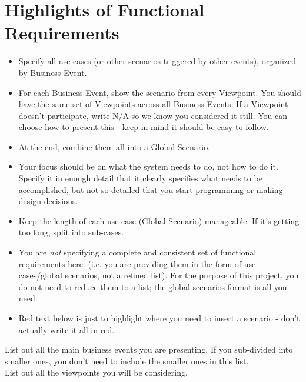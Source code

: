 \documentclass[]{article}
\begin{document}
\section{Highlights of Functional Requirements}
\label{sec:functional_requirements}
\begin{itemize}
	\item Specify all use cases (or other scenarios triggered by other events), organized by Business Event.
	\item For each Business Event, show the scenario from every Viewpoint. You should have the same set of Viewpoints across all Business Events. If a Viewpoint doesn't participate, write N/A so we know you considered it still. You can choose how to present this - keep in mind it should be easy to follow.
	\item At the end, combine them all into a Global Scenario.
	\item Your focus should be on what the system needs to do, not how to do it. Specify it in enough detail that it clearly specifies what needs to be accomplished, but not so detailed that you start programming or making design decisions.
	\item Keep the length of each use case (Global Scenario) manageable. If it's getting too long, split into sub-cases.
	\item You are \emph{not} specifying a complete and consistent set of functional requirements here. (i.e. you are providing them in the form of use cases/global scenarios, not a refined list). For the purpose of this project, you do not need to reduce them to a list; the global scenarios format is all you need.
	\item Red text below is just to highlight where you need to insert a scenario - don't actually write it all in red.
\end{itemize}

 List out all the main business events you are presenting. If you sub-divided into smaller ones, you don't need to include the smaller ones in this list.\\

 List out all the viewpoints you will be considering.\\
\end{document}

